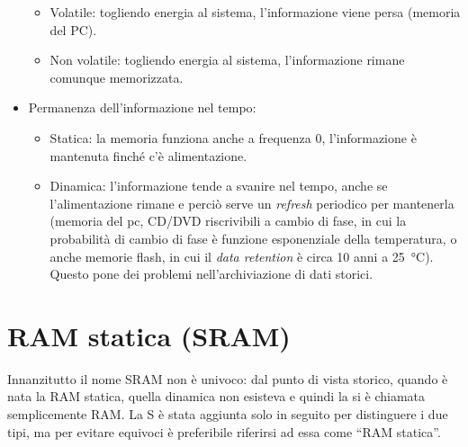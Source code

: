 \documentclass[11pt,4paper]{report}
\begin{document}
\begin{itemize}
	\begin{itemize}
		\item Volatile: togliendo energia al sistema, l'informazione viene persa (memoria del PC).
		\item Non volatile: togliendo energia al sistema, l'informazione rimane comunque memorizzata.
	\end{itemize}
	\pagebreak
	\item Permanenza dell'informazione nel tempo:
	\begin{itemize}
		\item Statica: la memoria funziona anche a frequenza 0, l'informazione è mantenuta finché c'è alimentazione.
		\item Dinamica: l'informazione tende a svanire nel tempo, anche se l'alimentazione rimane e perciò serve un \emph{refresh} periodico per mantenerla (memoria del pc, CD/DVD riscrivibili a cambio di fase, in cui la probabilità di cambio di fase è funzione esponenziale della temperatura, o anche memorie flash, in cui il \emph{data retention} è circa 10 anni a \SI{25}{\celsius}). Questo pone dei problemi nell'archiviazione di dati storici.
	\end{itemize}
\end{itemize}

\section{RAM statica (SRAM)}
Innanzitutto il nome SRAM non è univoco: dal punto di vista storico, quando è nata la RAM statica, quella dinamica non esisteva e quindi la si è chiamata semplicemente RAM. La S è stata aggiunta solo in seguito per distinguere i due tipi, ma per evitare equivoci è preferibile riferirsi ad essa come ``RAM statica''.
\end{document}
